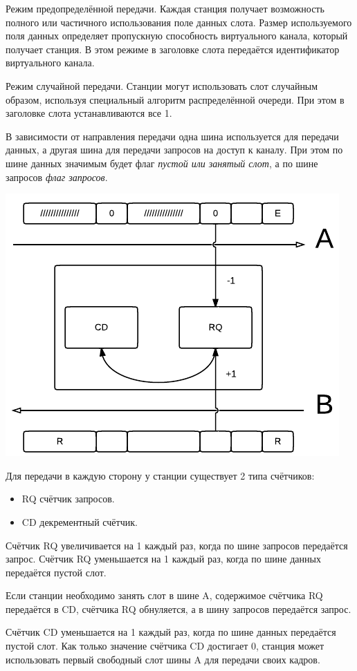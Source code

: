 \documentclass[12pt, russian, oneside, article]{ncc}
\begin{document}
\begin{itemize}
Режим предопределённой передачи. Каждая станция получает возможность полного или частичного использования поле данных слота. Размер используемого поля данных определяет пропускную способность виртуального канала, который получает станция. В этом режиме в заголовке слота передаётся идентификатор виртуального канала.

Режим случайной передачи. Станции могут использовать слот случайным образом, используя специальный алгоритм распределённой очереди. При этом в заголовке слота устанавливаются все 1.

В зависимости от направления передачи одна шина используется для передачи данных, а другая шина для передачи запросов на доступ к каналу. При этом по шине данных значимым будет флаг \emph{пустой или занятый слот}, а по шине запросов \emph{флаг запросов}.

\includegraphics[]{images/SiSPI/counters.png}

Для передачи в каждую сторону у станции существует 2 типа счётчиков:
\begin{itemize}
\item RQ счётчик запросов.
\item CD декрементный счётчик.
\end{itemize}

Счётчик RQ увеличивается на 1 каждый раз, когда по шине запросов передаётся запрос. Счётчик RQ уменьшается на 1 каждый раз, когда по шине данных передаётся пустой слот.

Если станции необходимо занять слот в шине A, содержимое счётчика RQ передаётся в CD, счётчика RQ обнуляется, а в шину запросов передаётся запрос.

Счётчик CD уменьшается на 1 каждый раз, когда по шине данных передаётся пустой слот. Как только значение счётчика CD достигает 0, станция может использовать первый свободный слот шины A для передачи своих кадров.

\end{itemize} %
\end{document}
